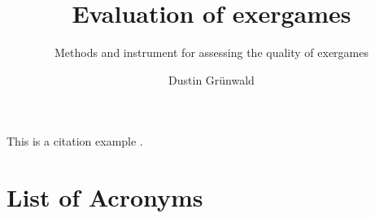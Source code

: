 \documentclass[
	language=english, %
	thesis={type=Seminar Paper}, %
	class=report,%
	ruledheaders=section,%
	accentcolor=3d,%
	marginpar=false,%
	parskip=half-,%
	fontsize=11pt,%
	IMRAD=false %
]{tudapub}
\begin{document}
\title{Evaluation of exergames}
\subtitle{Methods and instrument for assessing the quality of exergames}
\author[F. Surname]{Dustin Grünwald} %



\maketitle
\affidavit %
\tableofcontents


This is a citation example \cite{example}.




\clearpage
\chapter*{List of Acronyms}
\printacronyms[heading={none}]

\appendix

\languagename
\end{document}
